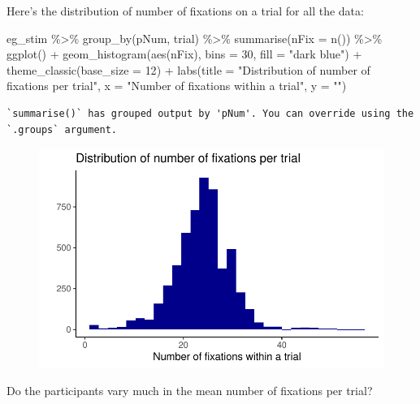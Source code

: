 \documentclass[
  letterpaper,
  DIV=11,
  numbers=noendperiod]{scrartcl}
\newenvironment{Shaded}{\begin{snugshade}}{\end{snugshade}}
\newcommand{\AttributeTok}[1]{\textcolor[rgb]{0.40,0.45,0.13}{#1}}
\newcommand{\DecValTok}[1]{\textcolor[rgb]{0.68,0.00,0.00}{#1}}
\newcommand{\FunctionTok}[1]{\textcolor[rgb]{0.28,0.35,0.67}{#1}}
\newcommand{\NormalTok}[1]{\textcolor[rgb]{0.00,0.23,0.31}{#1}}
\newcommand{\SpecialCharTok}[1]{\textcolor[rgb]{0.37,0.37,0.37}{#1}}
\newcommand{\StringTok}[1]{\textcolor[rgb]{0.13,0.47,0.30}{#1}}
\begin{document}
Here's the distribution of number of fixations on a trial for all the
data:

\begin{Shaded}
\begin{Highlighting}[]
\NormalTok{eg\_stim }\SpecialCharTok{\%\textgreater{}\%} 
  \FunctionTok{group\_by}\NormalTok{(pNum, trial) }\SpecialCharTok{\%\textgreater{}\%} 
  \FunctionTok{summarise}\NormalTok{(}\AttributeTok{nFix =} \FunctionTok{n}\NormalTok{()) }\SpecialCharTok{\%\textgreater{}\%} 
  \FunctionTok{ggplot}\NormalTok{() }\SpecialCharTok{+}
  \FunctionTok{geom\_histogram}\NormalTok{(}\FunctionTok{aes}\NormalTok{(nFix), }\AttributeTok{bins =} \DecValTok{30}\NormalTok{, }\AttributeTok{fill =} \StringTok{"dark blue"}\NormalTok{) }\SpecialCharTok{+} 
  \FunctionTok{theme\_classic}\NormalTok{(}\AttributeTok{base\_size =} \DecValTok{12}\NormalTok{) }\SpecialCharTok{+}
  \FunctionTok{labs}\NormalTok{(}\AttributeTok{title =} \StringTok{"Distribution of number of fixations per trial"}\NormalTok{,}
       \AttributeTok{x =} \StringTok{"Number of fixations within a trial"}\NormalTok{,}
       \AttributeTok{y =} \StringTok{""}\NormalTok{)}
\end{Highlighting}
\end{Shaded}

\begin{verbatim}
`summarise()` has grouped output by 'pNum'. You can override using the
`.groups` argument.
\end{verbatim}

\begin{figure}[H]

{\centering \includegraphics{inj_unsw_report_files/figure-pdf/unnamed-chunk-5-1.pdf}

}

\end{figure}

Do the participants vary much in the mean number of fixations per trial?
\end{document}

